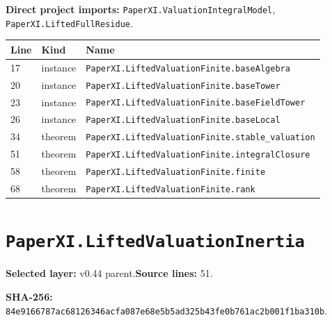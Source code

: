 \documentclass[10pt,oneside]{book}
\begin{document}

\textbf{Direct project imports:} \nolinkurl{PaperXI.ValuationIntegralModel}, \nolinkurl{PaperXI.LiftedFullResidue}.

\begin{longtable}{@{}p{}p{}p{}@{}}\toprule Line&Kind&Name\\\midrule\endhead

17&instance&\nolinkurl{PaperXI.LiftedValuationFinite.baseAlgebra}\\

20&instance&\nolinkurl{PaperXI.LiftedValuationFinite.baseTower}\\

23&instance&\nolinkurl{PaperXI.LiftedValuationFinite.baseFieldTower}\\

26&instance&\nolinkurl{PaperXI.LiftedValuationFinite.baseLocal}\\

34&theorem&\nolinkurl{PaperXI.LiftedValuationFinite.stable_valuation}\\

51&theorem&\nolinkurl{PaperXI.LiftedValuationFinite.integralClosure}\\

58&theorem&\nolinkurl{PaperXI.LiftedValuationFinite.finite}\\

68&theorem&\nolinkurl{PaperXI.LiftedValuationFinite.rank}\\

\bottomrule\end{longtable}

\section{\texorpdfstring{\nolinkurl{PaperXI.LiftedValuationInertia}}{PaperXI.LiftedValuationInertia}}\label{module:PaperXI.LiftedValuationInertia}

\textbf{Selected layer:} v0.44 parent.\quad\textbf{Source lines:} 51.\par\textbf{SHA-256:} {\scriptsize\nolinkurl{84e9166787ac68126346acfa087e68e5b5ad325b43fe0b761ac2b001f1ba310b}}.

\end{document}
